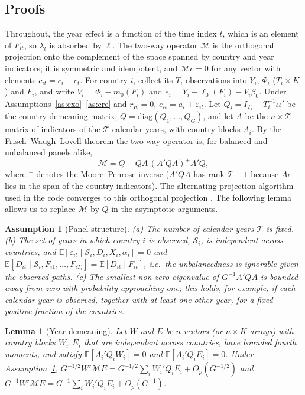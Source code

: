 \documentclass[pdflatex,sn-basic]{sn-jnl}%
\theoremstyle{thmstyleone}
\newtheorem{assumption}{Assumption}
\newtheorem{lemma}{Lemma}
\theoremstyle{thmstyletwo}
\newcommand{\E}{\mathbb{E}}
\newcommand{\M}{\mathcal{M}}
\begin{document}
\begin{appendices}
\section{Proofs}\label{app:proofs}

Throughout, the year effect is a function of the time index $t$, which is an element of $F_{it}$, so $\lambda_t$ is absorbed by $\ell$. The two-way operator $\M$ is the orthogonal projection onto the complement of the space spanned by country and year indicators; it is symmetric and idempotent, and $\M c=0$ for any vector with elements $c_{it}=c_i+c_t$. For country $i$, collect its $T_i$ observations into $Y_i$, $\Phi_i$ ($T_i\times K$) and $F_i$, and write $V_i=\Phi_i-m_0(F_i)$ and $e_i=Y_i-\ell_0(F_i)-V_i\beta_0$. Under Assumptions~\ref{as:exo}--\ref{as:cre} and $r_K=0$, $e_{it}=a_i+\varepsilon_{it}$. Let $Q_i=I_{T_i}-T_i^{-1}\iota\iota'$ be the country-demeaning matrix, $Q=\mathrm{diag}(Q_1,\dots,Q_G)$, and let $A$ be the $n\times\mathcal T$ matrix of indicators of the $\mathcal T$ calendar years, with country blocks $A_i$. By the Frisch--Waugh--Lovell theorem the two-way operator is, for balanced and unbalanced panels alike,
\[
\M=Q-QA\,(A'QA)^{+}A'Q ,
\]
where $^{+}$ denotes the Moore--Penrose inverse ($A'QA$ has rank $\mathcal T-1$ because $A\iota$ lies in the span of the country indicators). The alternating-projection algorithm used in the code converges to this orthogonal projection \citep[the von Neumann--Halperin theorem; see][]{gaure2013lfe}. The following lemma allows us to replace $\M$ by $Q$ in the asymptotic arguments.

\begin{assumption}[Panel structure]\label{as:panel}
(a) The number of calendar years $\mathcal T$ is fixed. (b) The set of years in which country $i$ is observed, $\mathcal S_i$, is independent across countries, and $\E[\varepsilon_{it}\mid \mathcal S_i,D_i,X_i,\alpha_i]=0$ and $\E[D_{it}\mid \mathcal S_i,F_{i1},\dots,F_{iT_i}]=\E[D_{it}\mid F_{it}]$, i.e.\ the unbalancedness is ignorable given the observed paths. (c) The smallest non-zero eigenvalue of $G^{-1}A'QA$ is bounded away from zero with probability approaching one; this holds, for example, if each calendar year is observed, together with at least one other year, for a fixed positive fraction of the countries.
\end{assumption}

\begin{lemma}[Year demeaning]\label{lem:year}
Let $W$ and $E$ be $n$-vectors (or $n\times K$ arrays) with country blocks $W_i,E_i$ that are independent across countries, have bounded fourth moments, and satisfy $\E[A_i'Q_iW_i]=0$ and $\E[A_i'Q_iE_i]=0$. Under Assumption~\ref{as:panel}, $G^{-1/2}W'\M E=G^{-1/2}\sum_iW_i'Q_iE_i+O_p(G^{-1/2})$ and $G^{-1}W'\M E=G^{-1}\sum_iW_i'Q_iE_i+O_p(G^{-1})$.
\end{lemma}


\end{appendices}
\end{document}
